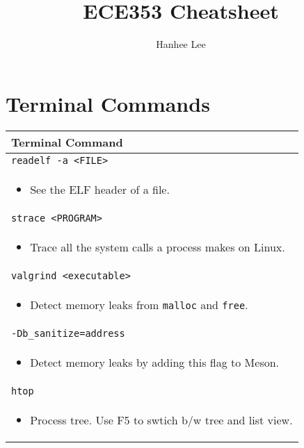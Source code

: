 \documentclass[twoside]{article}
\title{ECE353 Cheatsheet}
\author{Hanhee Lee}
\begin{document}
\section{Terminal Commands}
\begin{summary}
    \begin{center}
        \begin{tabular}{l}
        \toprule
        \textbf{Terminal Command} \\
        \midrule
        \texttt{readelf -a <FILE>} \\
        \multicolumn{1}{p{\linewidth}}{
        \begin{itemize}
            \item See the ELF header of a file.
        \end{itemize}} \\
        \midrule
        \texttt{strace <PROGRAM>} \\
        \multicolumn{1}{p{\linewidth}}{
        \begin{itemize}
            \item Trace all the system calls a process makes on Linux. 
        \end{itemize}} \\
        \midrule
        \texttt{valgrind <executable>} \\
        \multicolumn{1}{p{\linewidth}}{
        \begin{itemize}
            \item Detect memory leaks from \texttt{malloc} and \texttt{free}.
        \end{itemize}} \\
        \midrule
        \texttt{-Db\_sanitize=address} \\
        \multicolumn{1}{p{\linewidth}}{
        \begin{itemize}
            \item Detect memory leaks by adding this flag to Meson.
        \end{itemize}} \\
        \midrule
        \texttt{htop} \\
        \multicolumn{1}{p{\linewidth}}{
        \begin{itemize}
            \item Process tree. Use F5 to swtich b/w tree and list view.
        \end{itemize}} \\
        \bottomrule
        \end{tabular}
    \end{center}
\end{summary}
\newpage
\end{document}
